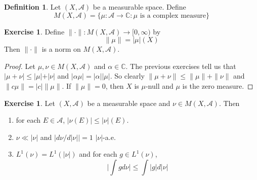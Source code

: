 \documentclass[12pt]{amsart}
\theoremstyle{definition}
\newtheorem{defn}[definition]{Definition}
\newtheorem{ex}[definition]{Exercise}
\newcommand{\al}{\alpha}
\newcommand{\C}{\mathbb{C}}
\newcommand{\MA}{\mathcal{A}}
\newcommand{\Rg}{[0,\infty)}
\newcommand{\lex}[1]{\label{ex:#1}}
\newcommand{\ld}[1]{\label{defn:#1}}
\begin{document}
	\begin{defn} \ld{00000} 
	Let $(X, \MA)$ be a measurable space. Define $$M(X, \MA) = \{\mu:\MA \rightarrow \C: \mu \text{ is a complex measure}\}$$
	\end{defn}

	\begin{ex} \lex{00000} 
	Define $\|\cdot \|: M(X, \MA) \rightarrow \Rg$ by $$\|\mu \|= \vert \mu \vert (X)$$ 
	Then $\|\cdot \|$ is a norm on $M(X, \MA)$. 
	\end{ex}
	
	\begin{proof}
		Let $\mu, \nu \in M(X, \MA)$ and $\al \in \C$. The previous exercises tell us that $\vert \mu + \nu \vert \leq \vert \mu \vert + \vert \nu \vert$ and $\vert \al \mu \vert = \vert \al \vert \vert \mu \vert$. So clearly $\|\mu + \nu \|\leq \|\mu \|+ \|\nu \|$ and $\|c \mu \|= \vert c \vert \|\mu \|$. If $\|\mu \|= 0$, then $X$ is $\mu$-null and $\mu$ is the zero measure.
	\end{proof}
	
	\begin{ex} \lex{00000} 
		Let $(X, \MA)$ be a measurable space and $\nu \in M(X, \MA)$. Then 
		
		\begin{enumerate}
			\item for each $E \in \MA$, $|\nu(E)| \leq |\nu|(E)$. 
			\item $\nu \ll |\nu|$ and $\big|d \nu /d |\nu|\big| = 1$ $|\nu|$-a.e.
			\item $L^1(\nu) = L^1(|\nu|)$ and for each $g \in L^1(\nu)$, $$ \bigg|\int g d\nu \bigg| \leq \int |g|d |\nu|$$
		\end{enumerate}
	\end{ex}
	
\end{document}
